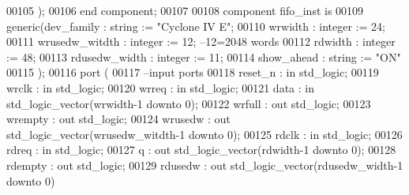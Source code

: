 \begin{DoxyCode}
00105         );
00106 \textcolor{keywordflow}{end} \textcolor{keywordflow}{component};
00107 
00108  \textcolor{keywordflow}{component} fifo_inst \textcolor{keywordflow}{is}
00109   \textcolor{keywordflow}{generic}(dev_family         : \textcolor{comment}{string}  := \textcolor{keyword}{"Cyclone IV E"};
00110           wrwidth         : \textcolor{comment}{integer} := \textcolor{vhdllogic}{}\textcolor{vhdllogic}{24};
00111           wrusedw_witdth  : \textcolor{comment}{integer} := \textcolor{vhdllogic}{}\textcolor{vhdllogic}{12}; \textcolor{keyword}{--12=2048 words }
00112           rdwidth         : \textcolor{comment}{integer} := \textcolor{vhdllogic}{}\textcolor{vhdllogic}{48};
00113           rdusedw_width   : \textcolor{comment}{integer} := \textcolor{vhdllogic}{}\textcolor{vhdllogic}{11};
00114           show_ahead      : \textcolor{comment}{string}  := \textcolor{keyword}{"ON"}
00115   );  
00116   \textcolor{keywordflow}{port} (
00117 \textcolor{keyword}{      --input ports }
00118       reset_n       : \textcolor{keywordflow}{in} \textcolor{comment}{std\_logic};
00119       wrclk         : \textcolor{keywordflow}{in} \textcolor{comment}{std\_logic};
00120       wrreq         : \textcolor{keywordflow}{in} \textcolor{comment}{std\_logic};
00121       data          : \textcolor{keywordflow}{in} \textcolor{comment}{std\_logic\_vector}(wrwidth\textcolor{vhdlchar}{-}\textcolor{vhdllogic}{}\textcolor{vhdllogic}{1} \textcolor{keywordflow}{downto} \textcolor{vhdllogic}{}\textcolor{vhdllogic}{0});
00122       wrfull        : \textcolor{keywordflow}{out} \textcolor{comment}{std\_logic};
00123         wrempty       : \textcolor{keywordflow}{out} \textcolor{comment}{std\_logic};
00124       wrusedw       : \textcolor{keywordflow}{out} \textcolor{comment}{std\_logic\_vector}(wrusedw_witdth\textcolor{vhdlchar}{-}\textcolor{vhdllogic}{}\textcolor{vhdllogic}{1} \textcolor{keywordflow}{downto} \textcolor{vhdllogic}{}\textcolor{vhdllogic}{0});
00125       rdclk          : \textcolor{keywordflow}{in} \textcolor{comment}{std\_logic};
00126       rdreq         : \textcolor{keywordflow}{in} \textcolor{comment}{std\_logic};
00127       q             : \textcolor{keywordflow}{out} \textcolor{comment}{std\_logic\_vector}(rdwidth\textcolor{vhdlchar}{-}\textcolor{vhdllogic}{}\textcolor{vhdllogic}{1} \textcolor{keywordflow}{downto} \textcolor{vhdllogic}{}\textcolor{vhdllogic}{0});
00128       rdempty       : \textcolor{keywordflow}{out} \textcolor{comment}{std\_logic};
00129       rdusedw       : \textcolor{keywordflow}{out} \textcolor{comment}{std\_logic\_vector}(rdusedw_width\textcolor{vhdlchar}{-}\textcolor{vhdllogic}{}\textcolor{vhdllogic}{1} \textcolor{keywordflow}{downto} \textcolor{vhdllogic}{}\textcolor{vhdllogic}{0})     

\end{DoxyCode}
